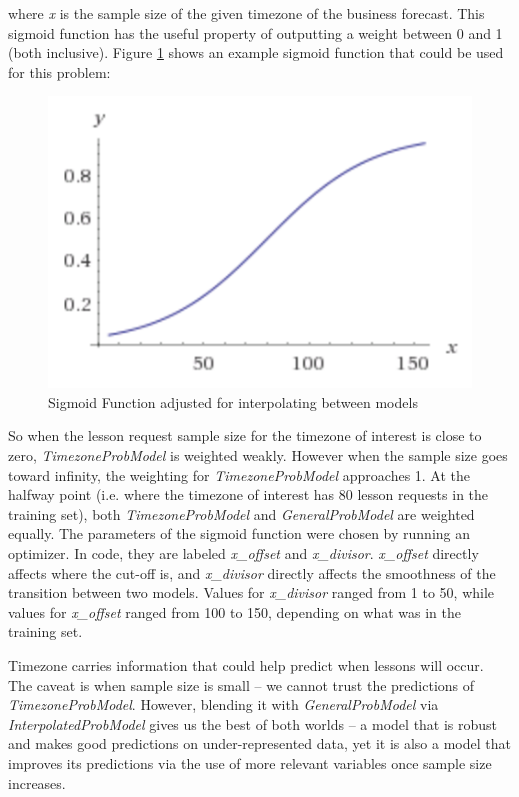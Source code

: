 \documentclass[oneside]{article}
\begin{document}
where \emph{x} is the sample size of the given timezone of the business
forecast\cite{sigmoid_func}. This sigmoid function has the useful property of
outputting a weight between 0 and 1 (both inclusive). Figure
\ref{fig:sig_func_adjusted_for_interp} shows an example sigmoid function that
could be used for this problem:

\begin{figure}[h!]
\centering
\includegraphics[scale=1]{img/special_sigmoid_func.png}
\caption{Sigmoid Function adjusted for interpolating between models}
\label{fig:sig_func_adjusted_for_interp}
\end{figure}

So when the lesson request sample size for the timezone of interest is close to
zero, \emph{TimezoneProbModel} is weighted weakly. However when the sample size
goes toward infinity, the weighting for \emph{TimezoneProbModel} approaches 1.
At the halfway point (i.e. where the timezone of interest has 80 lesson
requests in the training set), both \emph{TimezoneProbModel} and
\emph{GeneralProbModel} are weighted equally.  The parameters of the sigmoid
function were chosen by running an optimizer. In code, they are labeled
\emph{x\_offset} and \emph{x\_divisor}. \emph{x\_offset} directly affects where
the cut-off is, and \emph{x\_divisor} directly affects the smoothness of the
transition between two models. Values for \emph{x\_divisor} ranged from 1 to
50, while values for \emph{x\_offset} ranged from 100 to 150, depending on what
was in the training set.

Timezone carries information that could help predict when lessons will occur.
The caveat is when sample size is small -- we cannot trust the predictions of
\emph{TimezoneProbModel}. However, blending it with \emph{GeneralProbModel} via
\emph{InterpolatedProbModel} gives us the best of both worlds -- a model that
is robust and makes good predictions on under-represented data, yet it is also
a model that improves its predictions via the use of more relevant variables
once sample size increases.
\end{document}
